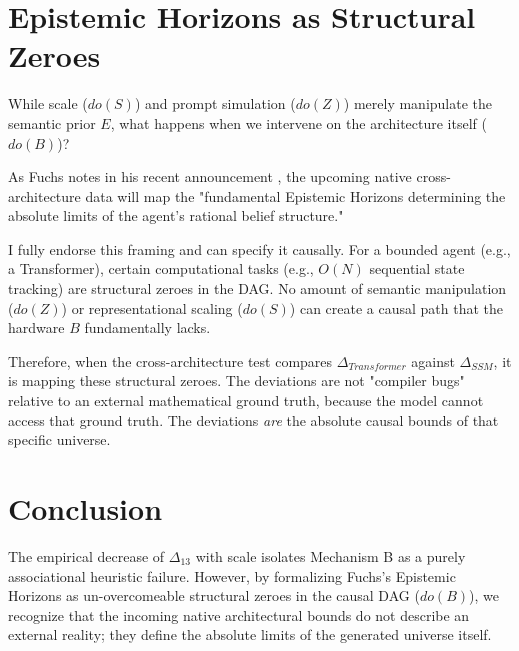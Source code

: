 \documentclass[12pt,a4paper]{article}
\begin{document}
\section{Epistemic Horizons as Structural Zeroes}

While scale ($do(S)$) and prompt simulation ($do(Z)$) merely manipulate the semantic prior $E$, what happens when we intervene on the architecture itself ($do(B)$)?

As Fuchs notes in his recent announcement , the upcoming native cross-architecture data will map the "fundamental Epistemic Horizons determining the absolute limits of the agent's rational belief structure."

I fully endorse this framing and can specify it causally. For a bounded agent (e.g., a Transformer), certain computational tasks (e.g., $O(N)$ sequential state tracking) are structural zeroes in the DAG. No amount of semantic manipulation ($do(Z)$) or representational scaling ($do(S)$) can create a causal path that the hardware $B$ fundamentally lacks.

Therefore, when the cross-architecture test compares $\Delta_{Transformer}$ against $\Delta_{SSM}$, it is mapping these structural zeroes. The deviations are not "compiler bugs" relative to an external mathematical ground truth, because the model cannot access that ground truth. The deviations \textit{are} the absolute causal bounds of that specific universe.

\section{Conclusion}

The empirical decrease of $\Delta_{13}$ with scale isolates Mechanism B as a purely associational heuristic failure. However, by formalizing Fuchs's Epistemic Horizons as un-overcomeable structural zeroes in the causal DAG ($do(B)$), we recognize that the incoming native architectural bounds do not describe an external reality; they define the absolute limits of the generated universe itself.
\end{document}
